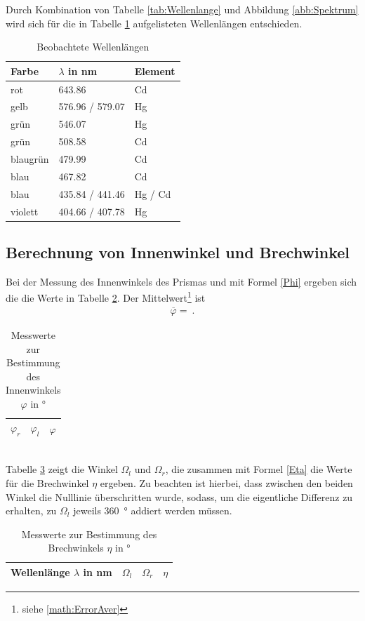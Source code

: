 Durch Kombination von Tabelle \ref{tab:Wellenlange} und Abbildung \ref{abb:Spektrum} wird sich für die in Tabelle \ref{tab:Wellen} aufgelisteten Wellenlängen entschieden.
\begin{table}[h!]
\centering
\begin{tabular}{lll}
	Farbe & $\lambda$ in \si{\nano\meter} & Element \\
	\hline
	rot & 643.86 & Cd \\
	gelb & 576.96 / 579.07 & Hg \\
	grün & 546.07 & Hg \\
	grün & 508.58 & Cd \\
	blaugrün & 479.99 & Cd \\
	blau & 467.82 & Cd \\
	blau & 435.84 / 441.46 & Hg / Cd \\
	violett & 404.66 / 407.78 & Hg
\end{tabular}
\caption{Beobachtete Wellenlängen}
\label{tab:Wellen}
\end{table}
\clearpage


\subsection{Berechnung von Innenwinkel und Brechwinkel}
Bei der Messung des Innenwinkels des Prismas und mit Formel \eqref{Phi} ergeben sich die die Werte in Tabelle \ref{tab:WinkelPhi}. Der Mittelwert\footnote{siehe \ref{math:ErrorAver}} ist
\begin{align}
	\overline{\varphi} =  \ .
\end{align}
\begin{table}[h!]
	\centering	
	\begin{tabular}{c|c|c}
		$\varphi_r$ & $\varphi_l$ & $\varphi$ \\
		\hline
		
	\end{tabular}
	\caption{Messwerte zur Bestimmung des Innenwinkels $\varphi$ in \si{\degree}}
	\label{tab:WinkelPhi}
\end{table} \\
Tabelle \ref{tab:WinkelFarben} zeigt die Winkel $\Omega_l$ und $\Omega_r$, die zusammen mit Formel \eqref{Eta} die Werte für die Brechwinkel $\eta$ ergeben. Zu beachten ist hierbei, dass zwischen den beiden Winkel die Nulllinie überschritten wurde, sodass, um die eigentliche Differenz zu erhalten, zu $\Omega_l$ jeweils \SI{360}{\degree} addiert werden müssen.
\begin{table}[h!]
	\centering	
	\begin{tabular}{c|c|c|c}
		Wellenlänge $\lambda$ in \si{\nano\meter} & $\Omega_l$ & $\Omega_r$ & $\eta$ \\
		\hline
		
	\end{tabular}
	\caption{Messwerte zur Bestimmung des Brechwinkels $\eta$ in \si{\degree}}
	\label{tab:WinkelFarben}
\end{table}
\clearpage


